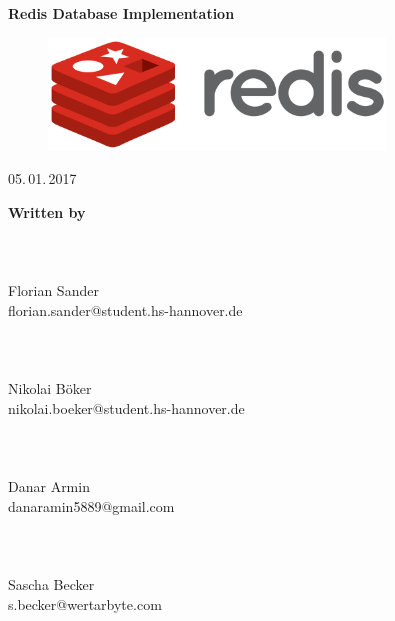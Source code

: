 \documentclass[11pt,DIV12,BCOR0mm,oneside,headings=normal,%
  numbers=noenddot,headsepline,headinclude]{scrreprt}
\begin{document}

\thispagestyle{empty}
{}

\begin{center}
  \vspace*{4\baselineskip}
  {\sffamily\bfseries\LARGE
    Redis Database Implementation\par}
  
  \vspace*{4\baselineskip}
  {\Large }

  \vfill
  {\Large }
  \begin{figure}[htb!]
  	\centerline{\includegraphics[width=0.8\textwidth]{resources/Redis_Logo.png}}
  \end{figure}
  
  
  \vspace*{4\baselineskip}
  {\Large \par}
  
  \vspace*{4\baselineskip}
  {\Large 05.\,01.\,2017}
  
  \vspace*{4\baselineskip}
\end{center}


{\huge\textbf{Written by}} \\
\\
\\
\textbf{} \\
Florian Sander \\
florian.sander@student.hs-hannover.de \\
\\
\\
\textbf{} \\
Nikolai Böker \\
nikolai.boeker@student.hs-hannover.de \\
\\
\\
\textbf{} \\
Danar Armin \\
danaramin5889@gmail.com \\
\\
\\
\textbf{} \\
Sascha Becker \\
s.becker@wertarbyte.com \\
\\
\\
\\
\\
\end{document}
